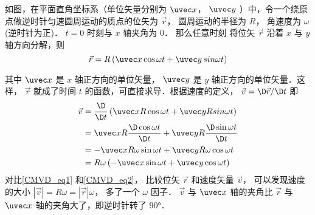 


如图，在平面直角坐标系（单位矢量分别为 $\uvec x$，  $\uvec y$ ）中，令一个绕原点做逆时针匀速圆周运动的质点的位矢为 $\vec r$， 圆周运动的半径为 $R$， 角速度为 $\omega $ (逆时针为正)． $t = 0$ 时刻与 $x$ 轴夹角为 $0$． 那么任意时刻 将位矢 $\vec r$ 沿着 $x$ 与 $y$ 轴方向分解，则
\begin{equation}\label{CMVD_eq1}
\vec r = R\left( {\uvec x\cos \omega t + \uvec y\,sin\omega t} \right)
\end{equation}

其中 $\uvec x$ 是 $x$ 轴正方向的单位矢量， $\uvec y$ 是 $y$ 轴正方向的单位矢量．这样， $\vec r$ 就成了时间 $t$ 的函数，可直接求导．根据速度的定义， $\vec v = \D\vec r / \D t$ 即
\begin{equation}\label{CMVD_eq2}
\begin{split}
\vec v &= \frac{\D}{{\D t}}\left( {\uvec xR\cos \omega t + \uvec yRsin\omega t} \right)\\
 &= \uvec xR\frac{{\D\cos \omega t}}{{\D t}} + \uvec yR\frac{{\D\sin \omega t}}{{\D t}}\\
 &= - \uvec xR\omega \sin \omega t + \uvec yR\omega \cos \omega t\\
 &= R\omega \left( { - \uvec x\sin \omega t + \uvec y\cos \omega t} \right)
\end{split}
\end{equation}
对比\autoref{CMVD_eq1} 和\autoref{CMVD_eq2}， 比较位矢 $\vec r$ 和速度矢量 $\vec v$， 可以发现速度的大小 $\left| {\vec v} \right| = R\omega  = \left| {\vec r} \right|\omega $， 多了一个 $\omega $ 因子． $\vec v$ 与 $\uvec x$ 轴的夹角比 $\vec r$ 与 $\uvec x$ 轴的夹角大了，即逆时针转了 $90°$． 
